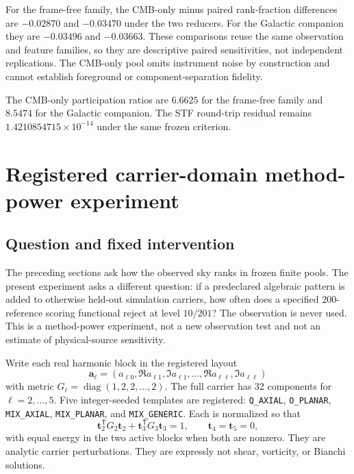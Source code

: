 \documentclass[11pt,a4paper]{article}
\begin{document}
For the frame-free family, the CMB-only minus paired rank-fraction differences
are $-0.02870$ and $-0.03470$ under the two reducers.  For the Galactic
companion they are $-0.03496$ and $-0.03663$.  These comparisons reuse the
same observation and feature families, so they are descriptive paired
sensitivities, not independent replications.  The CMB-only pool omits
instrument noise by construction and cannot establish foreground or
component-separation fidelity.

The CMB-only participation ratios are $6.6625$ for the frame-free family and
$8.5474$ for the Galactic companion.  The STF round-trip residual remains
$1.4210854715\times10^{-14}$ under the same frozen criterion.

\section{Registered carrier-domain method-power experiment}
\label{sec:power}

\subsection{Question and fixed intervention}

The preceding sections ask how the observed sky ranks in frozen finite pools.
The present experiment asks a different question: if a predeclared algebraic
pattern is added to otherwise held-out simulation carriers, how often does a
specified 200-reference scoring functional reject at level $10/201$?  The
observation is never used.  This is a method-power experiment, not a new
observation test and not an estimate of physical-source sensitivity.

Write each real harmonic block in the registered layout
\[
  \boldsymbol a_\ell=(a_{\ell0},\Re a_{\ell1},\Im a_{\ell1},\ldots,
  \Re a_{\ell\ell},\Im a_{\ell\ell})
\]
with metric $G_\ell=\operatorname{diag}(1,2,2,\ldots,2)$.  The full carrier
has 32 components for $\ell=2,\ldots,5$.  Five integer-seeded templates are
registered: \texttt{Q\_AXIAL}, \texttt{O\_PLANAR}, \texttt{MIX\_AXIAL},
\texttt{MIX\_PLANAR}, and \texttt{MIX\_GENERIC}.  Each is normalized so that
\[
  \boldsymbol t_2^{\mathsf T}G_2\boldsymbol t_2+
  \boldsymbol t_3^{\mathsf T}G_3\boldsymbol t_3=1,
  \qquad \boldsymbol t_4=\boldsymbol t_5=0,
\]
with equal energy in the two active blocks when both are nonzero.  They are
analytic carrier perturbations.  They are expressly not shear, vorticity, or
Bianchi solutions.
\end{document}

